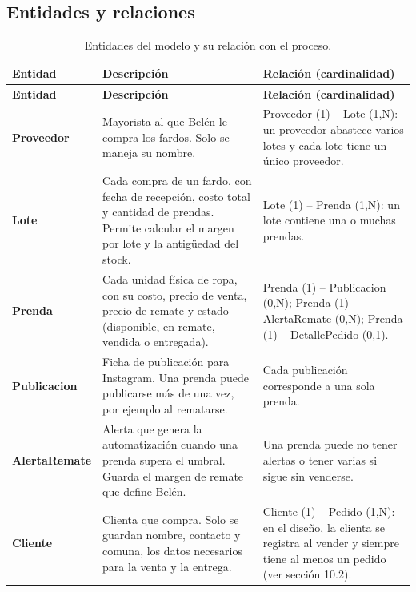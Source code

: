\documentclass[11pt,letterpaper]{article}
\begin{document}
\subsection{Entidades y relaciones}
{\footnotesize
\setlength{\tabcolsep}{3pt}\renewcommand{\arraystretch}{1.15}
\begin{longtable}{>{\raggedright\arraybackslash}p{}>{\raggedright\arraybackslash}p{}>{\raggedright\arraybackslash}p{}}
\caption{Entidades del modelo y su relación con el proceso.}\\
\hline
\rowcolor[HTML]{D9EAF7}\textbf{\textbf{Entidad}} & \textbf{\textbf{Descripción}} & \textbf{\textbf{Relación (cardinalidad)}} \\
\hline
\endfirsthead
\hline
\rowcolor[HTML]{D9EAF7}\textbf{\textbf{Entidad}} & \textbf{\textbf{Descripción}} & \textbf{\textbf{Relación (cardinalidad)}} \\
\hline
\endhead
\textbf{Proveedor} & Mayorista al que Belén le compra los fardos. Solo se maneja su nombre. & Proveedor (1) – Lote (1,N): un proveedor abastece varios lotes y cada lote tiene un único proveedor. \\
\hline
\textbf{Lote} & Cada compra de un fardo, con fecha de recepción, costo total y cantidad de prendas. Permite calcular el margen por lote y la antigüedad del stock. & Lote (1) – Prenda (1,N): un lote contiene una o muchas prendas. \\
\hline
\textbf{Prenda} & Cada unidad física de ropa, con su costo, precio de venta, precio de remate y estado (disponible, en remate, vendida o entregada). & Prenda (1) – Publicacion (0,N); Prenda (1) – AlertaRemate (0,N); Prenda (1) – DetallePedido (0,1). \\
\hline
\textbf{Publicacion} & Ficha de publicación para Instagram. Una prenda puede publicarse más de una vez, por ejemplo al rematarse. & Cada publicación corresponde a una sola prenda. \\
\hline
\textbf{AlertaRemate} & Alerta que genera la automatización cuando una prenda supera el umbral. Guarda el margen de remate que define Belén. & Una prenda puede no tener alertas o tener varias si sigue sin venderse. \\
\hline
\textbf{Cliente} & Clienta que compra. Solo se guardan nombre, contacto y comuna, los datos necesarios para la venta y la entrega. & Cliente (1) – Pedido (1,N): en el diseño, la clienta se registra al vender y siempre tiene al menos un pedido (ver sección 10.2). \\

\end{longtable}}
\end{document}

